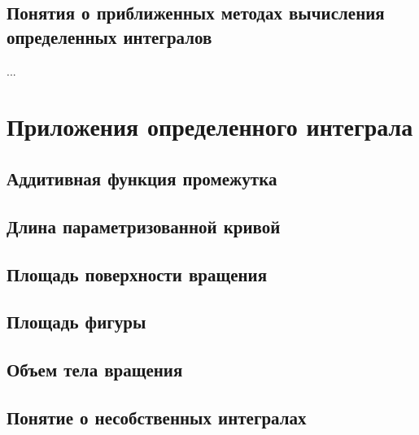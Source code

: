 \subsection{Понятия о приближенных методах вычисления определенных интегралов}
...

\section{Приложения определенного интеграла}
\subsection{Аддитивная функция промежутка}
\subsection{Длина параметризованной кривой} 
\subsection{Площадь поверхности вращения}
\subsection{Площадь фигуры}
\subsection{Объем тела вращения}
\subsection{Понятие о несобственных интегралах}

